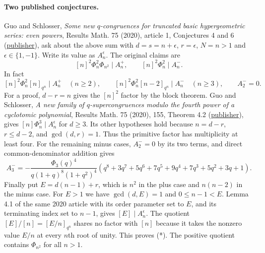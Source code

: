 \documentclass[11pt,a4paper]{article}
\numberwithin{equation}{section}
\begin{document}
\paragraph{Two published conjectures.}
Guo and Schlosser, \emph{Some new $q$-congruences for truncated basic
hypergeometric series: even powers}, Results Math. 75 (2020), article 1,
Conjectures 4 and 6 (\href{https://doi.org/10.1007/s00025-019-1126-4}{publisher}),
ask about the above sum with $d=s=n+\epsilon$, $r=\epsilon$,
$N=n>1$ and $\epsilon\in\{1,-1\}$. Write its value as $A_n^\epsilon$.
The original claims are
\[
 [n]^2\Phi_n^2\Phi_{n^2}\mid A_n^+,
 \qquad [n]^2\Phi_n^2\mid A_n^-.
\]
In fact
\[
 [n]^2\Phi_n^2[n]_{q^n}\mid A_n^+ \quad(n\ge2),\qquad
 [n]^2\Phi_n^2[n-2]_{q^n}\mid A_n^-\quad(n\ge3),\qquad A_2^-=0.
\tag{*}
\]
For a proof, $d-r=n$ gives the $[n]^2$ factor by the block theorem.
Guo and Schlosser, \emph{A new family of $q$-supercongruences modulo the
fourth power of a cyclotomic polynomial}, Results Math. 75 (2020), 155,
Theorem 4.2 (\href{https://doi.org/10.1007/s00025-020-01272-7}{publisher}),
gives $[n]\Phi_n^3\mid A_n^\epsilon$ for $d\ge3$. Its other hypotheses
hold because $n=d-r$, $r\le d-2$, and $\gcd(d,r)=1$. Thus the primitive
factor has multiplicity at least four. For the remaining minus cases,
$A_2^-=0$ by its two terms, and direct common-denominator addition gives
\[
 A_3^-=-\frac{\Phi_3(q)^4}{q(1+q)^8(1+q^2)^4}
   (q^8+3q^7+5q^6+7q^5+9q^4+7q^3+5q^2+3q+1).
\]
Finally put $E=d(n-1)+r$, which is $n^2$ in the plus case and $n(n-2)$
in the minus case. For $E>1$ we have $\gcd(d,E)=1$ and $0\le n-1<E$.
Lemma 4.1 of the same 2020 article with its order parameter set to $E$,
and its terminating index set to $n-1$, gives $[E]\mid A_n^\epsilon$.
The quotient $[E]/[n]=[E/n]_{q^n}$ shares no factor with $[n]$ because it
takes the nonzero value $E/n$ at every $n$th root of unity. This proves
(*). The positive quotient contains $\Phi_{n^2}$ for all $n>1$.
\end{document}
